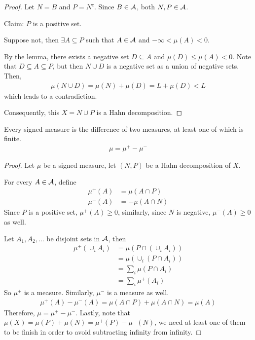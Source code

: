 \documentclass[11pt]{article}
\begin{document}
\begin{theorem}
\begin{proof}
			Let $N = B$ and $P = N^c$. Since $B \in \mathcal{{A}}$, both $N, P \in \mathcal{{A}}$.
			\begin{tcolorbox}
				Claim: $P$ is a positive set.
				
				Suppose not, then $\exists A \subseteq P$ such that $A \in \mathcal{{A}}$ and $-\infty < \mu(A) < 0$.
				
				By the lemma, there exists a negative set $D \subseteq A$ and $\mu(D) \leq \mu(A) < 0$. Note that $D \subseteq A \subseteq P$, but then $N \cup D$ is a negative set as a union of negative sets.
				Then,
				\begin{align}
					\mu(N \cup D) = \mu(N) + \mu(D)
					= L + \mu(D) < L
				\end{align}
				which leads to a contradiction.
			\end{tcolorbox}
			Consequently, this $X = N \cup P$ is a Hahn decomposition.
		\end{proof}
	\end{theorem}
	
	\begin{theorem}
		Every signed measure is the difference of two measures, at least one of which is finite.
		\begin{align}
			\mu = \mu^+ - \mu^-
		\end{align}
		\begin{proof}
			Let $\mu$ be a signed measure, let $(N, P)$ be a Hahn decomposition of $X$.
			
			For every $A \in \mathcal{{A}}$, define
			\begin{align}
				\mu^+(A) &= \mu(A \cap P) \\
				\mu^-(A) &= - \mu(A \cap N)
			\end{align}
			Since $P$ is a positive set, $\mu^+(A) \geq 0$, similarly, since $N$ is negative, $\mu^-(A) \geq 0$ as well.
			
			Let $A_1, A_2, \dots$ be disjoint sets in $\mathcal{{A}}$, then
			\begin{align}
				\mu^+(\cup_i A_i) &= \mu(P \cap (\cup_i A_i)) \\
				&= \mu(\cup_i (P \cap A_i)) \\
				&= \sum_i \mu(P \cap A_i) \\
				&= \sum_i \mu^+(A_i)
			\end{align}
			So $\mu^+$ is a measure. Similarly, $\mu^-$ is a measure as well.
			\begin{align}
				\mu^+(A) - \mu^-(A) = \mu(A \cap P) + \mu(A \cap N) = \mu(A)
			\end{align}
			Therefore, $\mu = \mu^+ - \mu^-$. Lastly, note that $\mu(X) = \mu(P) + \mu(N) = \mu^+(P) - \mu^-(N)$, we need at least one of them to be finish in order to avoid subtracting infinity from infinity.
		\end{proof}
	\end{theorem}
	
\end{document}
